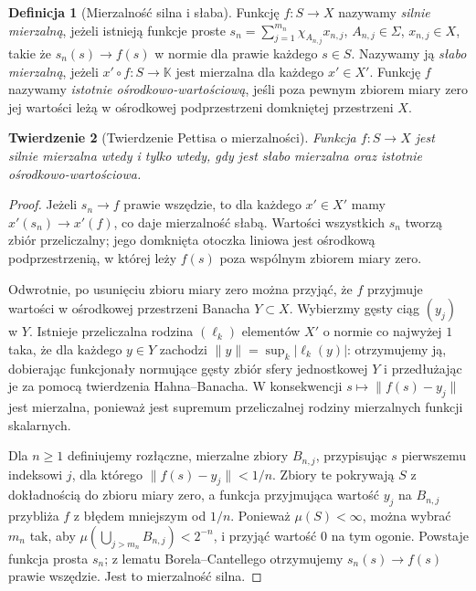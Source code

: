 \documentclass[11pt,a4paper]{article}
\numberwithin{equation}{section}
\theoremstyle{plain}
\newtheorem{twierdzenie}{Twierdzenie}[section]
\theoremstyle{definition}
\newtheorem{definicja}[twierdzenie]{Definicja}
\theoremstyle{remark}
\newcommand{\K}{\mathbb K}
\begin{document}
\begin{definicja}[Mierzalność silna i słaba]
\label{def:measurability15b}
Funkcję $f:S\to X$ nazywamy \emph{silnie mierzalną}, jeżeli istnieją
funkcje proste $s_n=\sum_{j=1}^{m_n}\chi_{A_{n,j}}x_{n,j}$,
$A_{n,j}\in\Sigma$, $x_{n,j}\in X$, takie że $s_n(s)\to f(s)$
w normie dla prawie każdego $s\in S$. Nazywamy ją
\emph{słabo mierzalną}, jeżeli $x'\circ f:S\to\K$ jest
mierzalna dla każdego $x'\in X'$. Funkcję $f$ nazywamy
\emph{istotnie ośrodkowo-wartościową}, jeśli poza pewnym zbiorem
miary zero jej wartości leżą w ośrodkowej podprzestrzeni domkniętej
przestrzeni $X$.
\end{definicja}

\begin{twierdzenie}[Twierdzenie Pettisa o mierzalności]
\label{thm:pettis-meas15b}
Funkcja $f:S\to X$ jest silnie mierzalna wtedy i tylko wtedy, gdy
jest słabo mierzalna oraz istotnie ośrodkowo-wartościowa.
\end{twierdzenie}
\begin{proof}
Jeżeli $s_n\to f$ prawie wszędzie, to dla każdego $x'\in X'$
mamy $x'(s_n)\to x'(f)$, co daje mierzalność słabą.
Wartości wszystkich $s_n$ tworzą zbiór przeliczalny;
jego domknięta otoczka liniowa jest ośrodkową podprzestrzenią,
w której leży $f(s)$ poza wspólnym zbiorem miary zero.

Odwrotnie, po usunięciu zbioru miary zero można przyjąć, że $f$
przyjmuje wartości w ośrodkowej przestrzeni Banacha $Y\subset X$.
Wybierzmy gęsty ciąg $(y_j)$ w $Y$. Istnieje przeliczalna
rodzina $(\ell_k)$ elementów $X'$ o normie co najwyżej $1$
taka, że dla każdego $y\in Y$ zachodzi
$\|y\|=\sup_k|\ell_k(y)|$: otrzymujemy ją, dobierając
funkcjonały normujące gęsty zbiór sfery jednostkowej $Y$
i przedłużając je za pomocą twierdzenia Hahna--Banacha.
W konsekwencji $s\mapsto\|f(s)-y_j\|$ jest mierzalna,
ponieważ jest supremum przeliczalnej rodziny mierzalnych
funkcji skalarnych.

Dla $n\ge1$ definiujemy rozłączne, mierzalne zbiory $B_{n,j}$,
przypisując $s$ pierwszemu indeksowi $j$, dla którego
$\|f(s)-y_j\|<1/n$. Zbiory te pokrywają $S$ z dokładnością
do zbioru miary zero, a funkcja przyjmująca wartość $y_j$
na $B_{n,j}$ przybliża $f$ z błędem mniejszym od $1/n$.
Ponieważ $\mu(S)<\infty$, można wybrać $m_n$ tak, aby
$\mu(\bigcup_{j>m_n}B_{n,j})<2^{-n}$, i przyjąć wartość
$0$ na tym ogonie. Powstaje funkcja prosta $s_n$;
z lematu Borela--Cantellego otrzymujemy $s_n(s)\to f(s)$
prawie wszędzie. Jest to mierzalność silna.
\end{proof}
\end{document}
